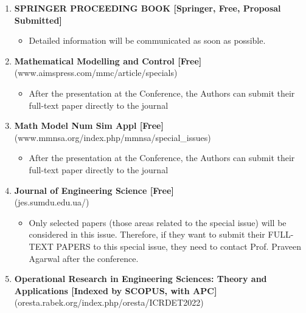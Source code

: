 \documentclass[twoside,11pt]{amsart}
\begin{document}
\begin{enumerate}
\begin{itemize}
\end{itemize}

\item {\bf SPRINGER PROCEEDING BOOK [Springer, Free, Proposal Submitted]}

\begin{itemize}

\item Detailed information will be communicated as soon as possible.

\end{itemize}

\item {\bf Mathematical Modelling and Control [Free]}\\
(www.aimspress.com/mmc/article/specials)


\begin{itemize}

\item After the presentation at the Conference, the Authors can submit their full-text paper directly to the journal

\end{itemize}

\item {\bf Math Model Num Sim Appl [Free]}\\
(www.mmnsa.org/index.php/mmnsa/special_issues)


\begin{itemize}

\item After the presentation at the Conference, the Authors can submit their full-text paper directly to the journal

\end{itemize}
\vskip 2mm
\newpage
\vskip 5mm
\item {\bf Journal of Engineering Science [Free]}\\
(jes.sumdu.edu.ua/)


\begin{itemize}

\item Only selected papers (those areas related to the special issue) will be considered in this issue. Therefore, if they want to submit their FULL-TEXT PAPERS to this special issue, they need to contact Prof. Praveen Agarwal after the conference.

\end{itemize}

\item {\bf Operational Research in Engineering Sciences: Theory and Applications [Indexed by SCOPUS, with APC]}\\
(oresta.rabek.org/index.php/oresta/ICRDET2022)



\end{enumerate}
\end{document}
